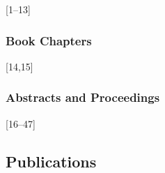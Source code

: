 \documentclass[
]{article}
\begin{document}
{[}1--13{]}

\hypertarget{book-chapters}{%
\subsubsection{Book Chapters}\label{book-chapters}}

{[}14,15{]}

\hypertarget{abstracts-and-proceedings}{%
\subsubsection{Abstracts and
Proceedings}\label{abstracts-and-proceedings}}

{[}16--47{]}

\hypertarget{publications}{%
\subsection*{Publications}\label{publications}}
\end{document}
